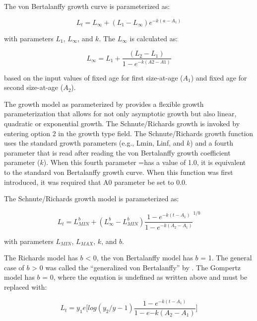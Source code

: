 
The von Bertalanffy growth curve is parameterized as:

\begin{equation}
	L_t = L_\infty + (L_{1}-L_\infty)e^{-k(a-A_{1})}
\end{equation}

with parameters $L_{1}$, $L_\infty$, and $k$. The $L_\infty$ is calculated as:

\begin{equation}
	L_\infty = L_{1} + \frac{(L_2 - L_1)}{1-e^{-k(A2-A1)}}
\end{equation}

based on the input values of fixed age for first size-at-age ($A_1$) and fixed age for second size-at-age ($A_2$). 

The \citet{richards1959growth} growth model as parameterized by \citet{schnute1981growth} provides a flexible growth parameterization that allows for not only asymptotic growth but also linear, quadratic or exponential growth. The Schnute/Richards growth is invoked by entering option 2 in the growth type field. The Schnute/Richards growth function uses the standard growth parameters (e.g., Lmin, Linf, and $k$) and a fourth parameter that is read after reading the von Bertalanffy growth coefficient parameter ($k$). When this fourth parameter =has a value of 1.0, it is equivalent to the standard von Bertalanffy growth curve. When this function was first introduced, it was required that A0 parameter be set to 0.0.

The Schnute/Richards growth model is parameterized as:

\begin{equation}
		L_t = L_{MIN}^b + (L_\infty^b-L_{MIN}^b)\frac{1-e^{-k(t-A_{1})}}{1-e^{-k(A_2-A_1)}}^{1/b}
\end{equation}

with parameters $L_{MIN}$, $L_{MAX}$, $k$, and $b$.

The Richards model has $b$ < 0, the von Bertalanffy model has $b$ = 1. The general case of $b$ > 0 was called the ``generalized von Bertalanffy'' by \citet{schnute1981growth}. The Gompertz model has $b$ = 0, where the equation is undefined as written above and must be replaced with: 

\begin{equation}
		L_t = y_1e\Big[log(y_2/y-1)\frac{1-e^{-k(t-A_1)}}{1-e{-k(A_2-A_1)}}\Big]
\end{equation}

